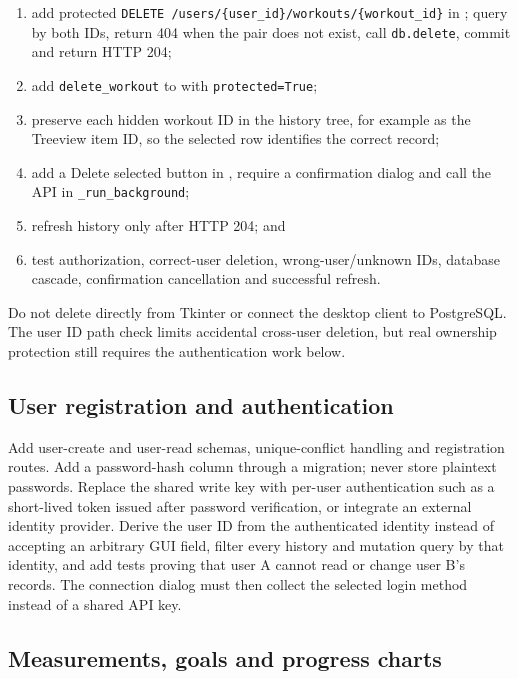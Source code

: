 \documentclass[11pt,a4paper]{article}
\newcommand{\filepath}[1]{\path{#1}}
\begin{document}
\begin{enumerate}
  \item add protected
        \texttt{DELETE /users/\{user\_id\}/workouts/\{workout\_id\}} in
        \filepath{main.py}; query by both IDs, return 404 when the pair does not
        exist, call \texttt{db.delete}, commit and return HTTP 204;
  \item add \texttt{delete\_workout} to \filepath{api.py} with
        \texttt{protected=True};
  \item preserve each hidden workout ID in the history tree, for example as the
        Treeview item ID, so the selected row identifies the correct record;
  \item add a Delete selected button in \filepath{ui.py}, require a confirmation
        dialog and call the API in \texttt{\_run\_background};
  \item refresh history only after HTTP 204; and
  \item test authorization, correct-user deletion, wrong-user/unknown IDs,
        database cascade, confirmation cancellation and successful refresh.
\end{enumerate}

Do not delete directly from Tkinter or connect the desktop client to
PostgreSQL. The user ID path check limits accidental cross-user deletion, but
real ownership protection still requires the authentication work below.

\subsection{User registration and authentication}

Add user-create and user-read schemas, unique-conflict handling and registration
routes. Add a password-hash column through a migration; never store plaintext
passwords. Replace the shared write key with per-user authentication such as a
short-lived token issued after password verification, or integrate an external
identity provider. Derive the user ID from the authenticated identity instead
of accepting an arbitrary GUI field, filter every history and mutation query
by that identity, and add tests proving that user A cannot read or change user
B's records. The connection dialog must then collect the selected login method
instead of a shared API key.

\subsection{Measurements, goals and progress charts}
\end{document}
